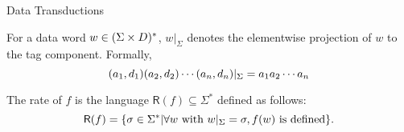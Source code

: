 \documentclass[landscape]{beamer}
\newcommand{\sfR}{\mathsf{R}}
\begin{document}
\begin{frame}{Data Transductions}
    \begin{definition}
    For a data word $w \in (\Sigma \times D)^*$,
    $w|_\Sigma$ denotes the elementwise projection of $w$ to the tag component.
    Formally,
    \[
        (a_1, d_1)(a_2, d_2)\cdots(a_n, d_n)|_\Sigma = a_1a_2 \cdots a_n
    \]
    \end{definition}
    \pause
    
    \begin{definition}
    The \alert{rate} of $f$ is the language $\sfR(f) \subseteq \Sigma^*$
    defined as follows:
    \[
    \sfR(f) = 
        \{ \sigma \in \Sigma^* |
            \forall w \text{ with } w\tagproj = \sigma,
            f(w) \text{ is defined}
        \}.
    \]
    \end{definition}
\end{frame}
\end{document}
